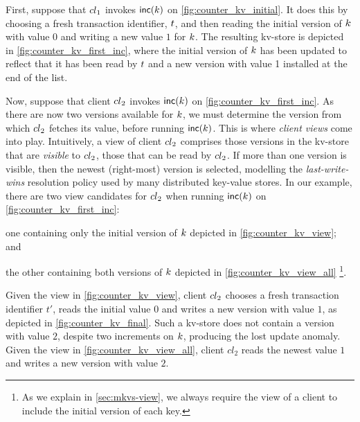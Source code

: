 First, suppose that \({cl}_1\) invokes \(\mathsf{inc}(k)\) on
\cref{fig:counter_kv_initial}.
It does this by choosing a fresh transaction identifier, \(t\), 
and then reading the initial version
of \(k\) with value \(0\) 
and writing  a new value \(1\) for \(k\). 
The resulting kv-store is depicted in \cref{fig:counter_kv_first_inc},
where  the initial version of \(k\)  has been  updated to reflect that it
has been read by \(t\) and a new version with value 1 installed at
the end of the list.

Now, suppose that client \({cl}_2\) invokes \(\mathsf{inc}(k)\)  on
\cref{fig:counter_kv_first_inc}.  As there are now two versions
available for \(k\), we must determine the version from which
\({cl}_2\) fetches its value, before running \(\mathsf{inc}(k)\).  This is
where \emph{client views} come into play.  Intuitively, a view of
client \({cl}_2\) comprises those versions in the kv-store that are
\emph{visible} to \({cl}_2\), \ie those that can be read by
\({cl}_2\).  If more than one version is visible, then the newest
(right-most) version is selected, modelling the \emph{last-write-wins}
resolution policy used by many distributed key-value stores.
In our example, there are two view candidates for \({cl}_2\) when running
\(\mathsf{inc}(k)\) on \cref{fig:counter_kv_first_inc}: 
\begin{enumerate*}
\item one containing
only the initial version of \(k\) depicted in \cref{fig:counter_kv_view}; and
\item the other containing both versions of \(k\) depicted in \cref{fig:counter_kv_view_all}%
\footnote{As we explain in \cref{sec:mkvs-view}, we always require
  the view of a client to include the initial version of each key.}.
\end{enumerate*}
Given the view in \cref{fig:counter_kv_view},
client \({cl}_2\) chooses a fresh
transaction identifier \(t'\), reads the initial value \(0\) and writes a
new version with value \(1\), as depicted in \cref{fig:counter_kv_final}. 
Such a kv-store does not contain a
version with value \(2\), despite two increments on \(k\), producing
the lost update anomaly. 
Given the view in \cref{fig:counter_kv_view_all},
client \(cl_2\) reads the newest
value \(1\) and writes a new version with value \(2\).

